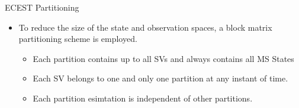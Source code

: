 \documentclass{beamer}
\begin{document}
\begin{frame}
ECEST Partitioning\\
 \begin{itemize}
 \item To reduce the size of the state and observation spaces, a block matrix partitioning scheme is employed.
 \begin{itemize}
   \item Each partition contains up to all SVs and always contains all MS States
   \item Each SV belongs to one and only one partition at any instant of time.
   \item Each partition esimtation is independent of other partitions.
 \end{itemize}
\end{itemize}
\end{frame}




\end{document}

